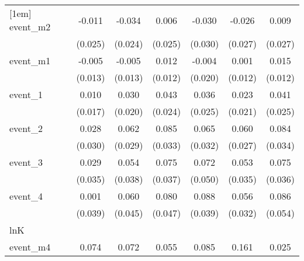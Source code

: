 {\begin{tabular}{l*{6}{c}}
[1em]
event\_m2    &      -0.011         &      -0.034         &       0.006         &      -0.030         &      -0.026         &       0.009         \\
            &     (0.025)         &     (0.024)         &     (0.025)         &     (0.030)         &     (0.027)         &     (0.027)         \\
[1em]
event\_m1    &      -0.005         &      -0.005         &       0.012         &      -0.004         &       0.001         &       0.015         \\
            &     (0.013)         &     (0.013)         &     (0.012)         &     (0.020)         &     (0.012)         &     (0.012)         \\
[1em]
event\_1     &       0.010         &       0.030         &       0.043         &       0.036         &       0.023         &       0.041         \\
            &     (0.017)         &     (0.020)         &     (0.024)         &     (0.025)         &     (0.021)         &     (0.025)         \\
[1em]
event\_2     &       0.028         &       0.062\sym{*}  &       0.085\sym{*}  &       0.065\sym{*}  &       0.060\sym{*}  &       0.084\sym{*}  \\
            &     (0.030)         &     (0.029)         &     (0.033)         &     (0.032)         &     (0.027)         &     (0.034)         \\
[1em]
event\_3     &       0.029         &       0.054         &       0.075\sym{*}  &       0.072         &       0.053         &       0.075\sym{*}  \\
            &     (0.035)         &     (0.038)         &     (0.037)         &     (0.050)         &     (0.035)         &     (0.036)         \\
[1em]
event\_4     &       0.001         &       0.060         &       0.080         &       0.088\sym{*}  &       0.056         &       0.086         \\
            &     (0.039)         &     (0.045)         &     (0.047)         &     (0.039)         &     (0.032)         &     (0.054)         \\
\hline
lnK         &                     &                     &                     &                     &                     &                     \\
event\_m4    &       0.074         &       0.072         &       0.055         &       0.085         &       0.161         &       0.025         \\

\end{tabular}}
